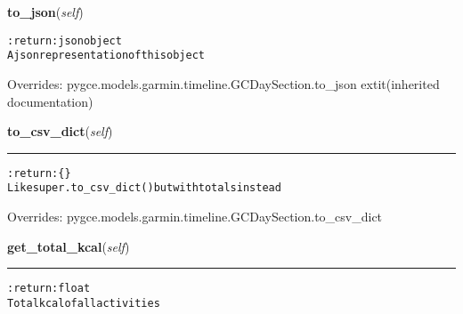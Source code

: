    \vspace{0.5ex}

\hspace{.8\funcindent}\begin{boxedminipage}{\funcwidth}

    \raggedright \textbf{to\_json}(\textit{self})

\setlength{\parskip}{2ex}
\begin{alltt}

:return: json object
    A json representation of this object
\end{alltt}

\setlength{\parskip}{1ex}
      Overrides: pygce.models.garmin.timeline.GCDaySection.to\_json 	extit{(inherited documentation)}

    \end{boxedminipage}

    \vspace{0.5ex}

\hspace{.8\funcindent}\begin{boxedminipage}{\funcwidth}

    \raggedright \textbf{to\_csv\_dict}(\textit{self})

    \vspace{-1.5ex}

    \rule{\textwidth}{0.5\fboxrule}
\setlength{\parskip}{2ex}
\begin{alltt}

:return: \{\}
    Like super.to\_csv\_dict() but with totals instead
\end{alltt}

\setlength{\parskip}{1ex}
      Overrides: pygce.models.garmin.timeline.GCDaySection.to\_csv\_dict

    \end{boxedminipage}

    \label{pygce:models:garmin:timeline:GCDayActivities:get_total_kcal}

    \vspace{0.5ex}

\hspace{.8\funcindent}\begin{boxedminipage}{\funcwidth}

    \raggedright \textbf{get\_total\_kcal}(\textit{self})

    \vspace{-1.5ex}

    \rule{\textwidth}{0.5\fboxrule}
\setlength{\parskip}{2ex}
\begin{alltt}

:return: float
    Total kcal of all activities
\end{alltt}

\setlength{\parskip}{1ex}
    \end{boxedminipage}

